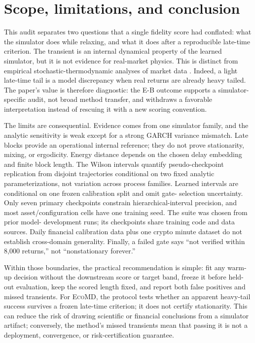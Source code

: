 \documentclass{article}
\newcommand{\method}{\textsc{EcoMD}}
\begin{document}
\section{Scope, limitations, and conclusion}

This audit separates two questions that a single fidelity score had conflated: what the simulator does
while relaxing, and what it does after a reproducible late-time criterion. The transient is an internal
dynamical property of the learned simulator, but it is not evidence for real-market physics. This is
distinct from empirical stochastic-thermodynamic analyses of market data \citep{maskawa2025}. Indeed,
a light late-time tail is a model discrepancy when real returns are already heavy tailed. The paper's
value is therefore diagnostic: the E-B outcome supports a simulator-specific audit, not broad method
transfer, and withdraws a favorable interpretation instead of rescuing it with a new scoring convention.

The limits are consequential. Evidence comes from one simulator family, and the analytic sensitivity
is weak except for a strong GARCH variance mismatch. Late blocks provide an operational internal
reference; they do not prove stationarity, mixing, or ergodicity. Energy distance depends on the chosen
delay embedding and finite block length. The Wilson intervals quantify pseudo-checkpoint replication
from disjoint trajectories conditional on two fixed analytic parameterizations, not variation across
process families. Learned intervals are conditional on one frozen calibration split and omit gate-
selection uncertainty. Only seven primary checkpoints constrain hierarchical-interval precision, and
most asset/configuration cells have one training seed. The suite was chosen from prior model-
development runs; its checkpoints share training code and data sources. Daily financial calibration
data plus one crypto minute dataset do not establish cross-domain generality. Finally, a failed gate
says ``not
verified within 8,000 returns,'' not ``nonstationary forever.''

Within those boundaries, the practical recommendation is simple: fit any warm-up decision without
the downstream score or target band, freeze it before held-out evaluation, keep the scored length
fixed, and report both false positives and missed transients. For \method, the protocol tests whether
an apparent heavy-tail success survives a frozen late-time criterion; it does not certify stationarity.
This can reduce the
risk of drawing scientific or financial conclusions from a simulator artifact; conversely, the
method's missed transients mean that passing it is not a deployment, convergence, or risk-certification
guarantee.
\end{document}
